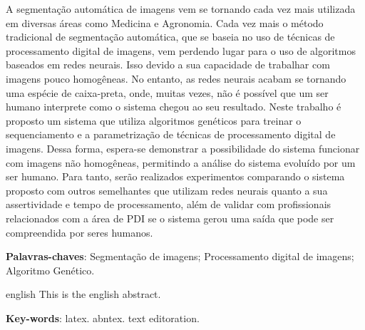 \documentclass[12pt,oneside,a4paper,english,french,spanish,brazil,]{abntex2}
\begin{document}

\frenchspacing 

\imprimircapa
\imprimirfolhaderosto


\begin{resumo}
A segmentação automática de imagens vem se tornando cada vez mais utilizada em diversas áreas como Medicina e Agronomia. Cada vez mais o método tradicional de segmentação automática, que se baseia no uso de técnicas de processamento digital de imagens, vem perdendo lugar para o uso de algoritmos baseados em redes neurais. Isso devido a sua capacidade de trabalhar com imagens pouco homogêneas. No entanto, as redes neurais acabam se tornando uma espécie de caixa-preta, onde, muitas vezes, não é possível que um ser humano interprete como o sistema chegou ao seu resultado. Neste trabalho é proposto um sistema que utiliza algoritmos genéticos para treinar o sequenciamento e a parametrização de técnicas de processamento digital de imagens. Dessa forma, espera-se demonstrar a possibilidade do sistema funcionar com imagens não homogêneas, permitindo a análise do sistema evoluído por um ser humano. Para tanto, serão realizados experimentos comparando o sistema proposto com outros semelhantes que utilizam redes neurais quanto a sua assertividade e tempo de processamento, além de validar com profissionais relacionados com a área de PDI se o sistema gerou uma saída que pode ser compreendida por seres humanos.
 \vspace{\onelineskip}
    
 \noindent
 \textbf{Palavras-chaves}: Segmentação de imagens; Processamento digital de imagens; Algoritmo Genético.
\end{resumo}

\begin{resumo}[Abstract]
 \begin{otherlanguage*}{english}
   This is the english abstract.

   \vspace{\onelineskip}
 
   \noindent 
   \textbf{Key-words}: latex. abntex. text editoration.
 \end{otherlanguage*}
\end{resumo}
\end{document}
